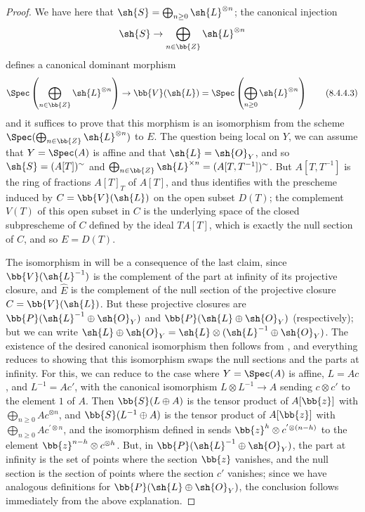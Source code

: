 \begin{proof}
We have here that $\sh{S}=\bigoplus_{n\geq0}\sh{L}^{\otimes n}$;
the canonical injection
\[
  \sh{S} \to \bigoplus_{n\in\bb{Z}} \sh{L}^{\otimes n}
\]
defines a canonical dominant morphism
\[
\label{eq:2.8.4.4.3}
  \Spec\left(
    \bigoplus_{n\in\bb{Z}} \sh{L}^{\otimes n}
  \right)
  \to
  \bb{V}(\sh{L})
  =
  \Spec\left(
    \bigoplus_{n\geq0} \sh{L}^{\otimes n}
  \right)
\tag{8.4.4.3}
\]
and it suffices to prove that this morphism is an isomorphism from the scheme $\Spec(\bigoplus_{n\in\bb{Z}} \sh{L}^{\otimes n})$ to $E$.
The question being local on $Y$, we can assume that $Y=\Spec(A)$ is affine
and that $\sh{L}=\sh{O}_Y$, and so $\sh{S}=(A[T])^\sim$ and $\bigoplus_{n\in\bb{Z}}\sh{L}^{\times n} = (A[T,T^{-1}])^\sim$.
But $A[T,T^{-1}]$ is the ring of fractions $A[T]_T$ of $A[T]$, and thus  identifies  with the prescheme induced by $C=\bb{V}(\sh{L})$ on the open subset $D(T)$;
the complement $V(T)$ of this open subset in $C$ is the underlying space of the closed subprescheme of $C$ defined by the ideal $TA[T]$, which is exactly the null section of $C$, and so $E=D(T)$.

The isomorphism in  will be a consequence of the last claim, since $\bb{V}(\sh{L}^{-1})$ is the complement of the part at infinity of its projective closure, and $\widehat{E}$ is the complement of the null section of the projective closure $C=\bb{V}(\sh{L})$.
But these projective closures are $\bb{P}(\sh{L}^{-1}\oplus\sh{O}_Y)$ and $\bb{P}(\sh{L}\oplus\sh{O}_Y)$ (respectively);
but we can write $\sh{L}\oplus\sh{O}_Y = \sh{L}\otimes(\sh{L}^{-1}\oplus\sh{O}_Y)$.
The existence of the desired canonical isomorphism then follows from , and everything reduces to showing that this isomorphism swaps the null sections and the parts at infinity.
For this, we can reduce to the case where $Y=\Spec(A)$ is affine, $L=Ac$, and $L^{-1}=Ac'$, with the canonical isomorphism $L\otimes L^{-1}\to A$ sending $c\otimes c'$ to the element $1$ of $A$.
Then $\bb{S}(L\oplus A)$ is the tensor product of $A[\bb{z}]$ with $\bigoplus_{n\geq0}Ac^{\otimes n}$, and $\bb{S}(L^{-1}\oplus A)$ is the tensor product of $A[\bb{z}]$ with $\bigoplus_{n\geq0}Ac^{'\otimes n}$, and the isomorphism defined in  sends $\bb{z}^h\otimes c^{'\otimes(n-h)}$ to the element $\bb{z}^{n-h}\otimes c^{\otimes h}$.
But, in $\bb{P}(\sh{L}^{-1}\oplus\sh{O}_Y)$, the part at infinity is the set of points where the section $\bb{z}$ vanishes, and the null section is the section of points where the section $c'$ vanishes;
since we have analogous definitions for $\bb{P}(\sh{L}\oplus\sh{O}_Y)$, the conclusion follows immediately from the above explanation.
\end{proof}


